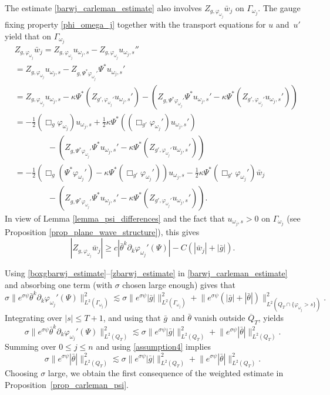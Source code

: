 \documentclass[11pt,letterpaper]{amsart}
\theoremstyle{definition}
\numberwithin{equation}{section}
\newcommand{\norm}[1]{\lVert #1 \rVert}         %
\newcommand{\ol}[1]{\overline{#1}}
\newcommand{\p}{\partial}
\def\p{\partial}
\begin{document}
The estimate \eqref{barwj_carleman_estimate} also involves $Z_{g,\varphi_{\omega_j}} \bar{w}_j$ on $\Gamma_{\omega_j}$. 
The gauge fixing property \eqref{phi_omega_j} together with the transport equations for $u$ and $u'$ yield that on $\Gamma_{\omega_j}$ 
\begin{align*}
 &Z_{g,\varphi_{\omega_j}} \bar{w}_j = Z_{g,\varphi_{\omega_j}} u_{\omega_j,s} - Z_{g,\varphi_{\omega_j}} u_{\omega_j,s}'' \\
 &= Z_{g,\varphi_{\omega_j}} u_{\omega_j,s} - Z_{g,\Psi^* \varphi_{\omega_j}'} \Psi^* u_{\omega_j,s}' \\
 &= Z_{g,\varphi_{\omega_j}} u_{\omega_j,s} - \kappa \Psi^* (Z_{g',\varphi_{\omega_j}'} u_{\omega_j,s}') - (Z_{g,\Psi^* \varphi_{\omega_j}'} \Psi^* u_{\omega_j,s}' - \kappa \Psi^* (Z_{g',\varphi_{\omega_j}'} u_{\omega_j,s}')) \\
 &=-\frac{1}{2} (\Box_g \varphi_{\omega_j}) u_{\omega_j,s} + \frac{1}{2} \kappa \Psi^*( (\Box_{g'} \varphi_{\omega_j}') u_{\omega_j,s}' ) \\
 &\qquad  \qquad -(Z_{g,\Psi^* \varphi_{\omega_j}'} \Psi^* u_{\omega_j,s}' - \kappa \Psi^* ( Z_{g',\varphi_{\omega_j}'} u_{\omega_j,s}')) \\
 &=-\frac{1}{2} (\Box_g (\Psi^* \varphi_{\omega_j}') - \kappa \Psi^*( \Box_{g'} \varphi_{\omega_j}')) u_{\omega_j,s} - \frac{1}{2} \kappa \Psi^*( \Box_{g'} \varphi_{\omega_j}') \bar{w}_j \\
 &\qquad  \qquad -(Z_{g,\Psi^* \varphi_{\omega_j}'} \Psi^* u_{\omega_j,s}' - \kappa \Psi^* ( Z_{g',\varphi_{\omega_j}'} u_{\omega_j,s}')).
\end{align*}
In view of Lemma \ref{lemma_psi_differences} and the fact that $u_{\omega_j,s} > 0$ on $\Gamma_{\omega_j}$ (see Proposition \ref{prop_plane_wave_structure}), this gives 
\begin{equation} \label{zbarwj_estimate}
|Z_{g,\varphi_{\omega_j}} \bar{w}_j| \geq c |\bar{\theta}^k \p_k \varphi_{\omega_j}'(\Psi)| - C(|\bar{w}_j| + |\bar{g}|).
\end{equation}

Using \eqref{boxgbarwj_estimate}--\eqref{zbarwj_estimate} in \eqref{barwj_carleman_estimate} and absorbing one term (with $\sigma$ chosen large enough) gives that 
\[
\sigma \norm{e^{\sigma \psi} \bar{\theta}^k \p_k \varphi_{\omega_j}'(\Psi)}_{L^2(\Gamma_{\omega_j})}^2 
 \lesssim \sigma \norm{e^{\sigma \psi} |\bar{g}|}_{L^2(\Gamma_{\omega_j})}^2 + \norm{e^{\sigma \psi} (|\bar{g}| + |\bar{\theta}|)}_{L^2(Q_T \cap \{ \varphi_{\omega_j} > s \})}^2.
\]
Integrating over $|s| \leq T+1$, and using that $\bar{g}$ and $\bar{\theta}$ vanish outside $\ol{Q}_T$, yields 
\[
\sigma \norm{e^{\sigma \psi} \bar{\theta}^k \p_k \varphi_{\omega_j}'(\Psi)}_{L^2(Q_T)}^2 
 \lesssim \sigma \norm{e^{\sigma \psi} |\bar{g}|}_{L^2(Q_T)}^2 + \norm{e^{\sigma \psi} |\bar{\theta}|}_{L^2(Q_T)}^2.
\]
Summing over $0 \leq j \leq n$ and using \eqref{assumption4} implies 
\[
\sigma \norm{e^{\sigma \psi} |\bar{\theta}|}_{L^2(Q_T)}^2 
 \lesssim \sigma \norm{e^{\sigma \psi} |\bar{g}|}_{L^2(Q_T)}^2 + \norm{e^{\sigma \psi} |\bar{\theta}|}_{L^2(Q_T)}^2.
\]
Choosing $\sigma$ large, we obtain the first consequence of the weighted estimate in Proposition~\ref{prop_carleman_psi}.
\end{document}
